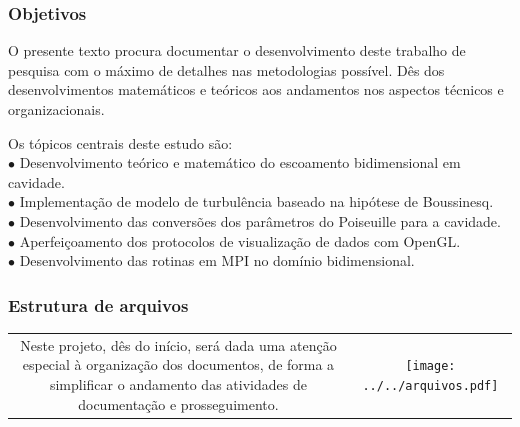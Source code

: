 \documentclass[xcolor=dvipsnames,10pt,aspectratio=169]{beamer}
\begin{document}
	\begin{frame}
		\frametitle{Objetivos}
					
		\centering
		O presente texto procura documentar o desenvolvimento deste trabalho de pesquisa com o máximo de detalhes nas metodologias possível. Dês dos desenvolvimentos matemáticos e teóricos aos andamentos nos aspectos técnicos e organizacionais.
		
		\vspace{0.5cm}
		
		\flushleft
		Os tópicos centrais deste estudo são:\\
		\quad $\bullet$ Desenvolvimento teórico e matemático do escoamento bidimensional em cavidade.\\
		\quad $\bullet$ Implementação de modelo de turbulência baseado na hipótese de Boussinesq. \\
		\quad $\bullet$ Desenvolvimento das conversões dos parâmetros do Poiseuille para a cavidade.\\
		\quad $\bullet$ Aperfeiçoamento dos protocolos de visualização de dados com OpenGL.\\
		\quad $\bullet$ Desenvolvimento das rotinas em MPI no domínio bidimensional.\\
		
	\end{frame}





	\begin{frame}
		\frametitle{Estrutura de arquivos}
		\begin{tabular}{c c}
			{
				\begin{minipage}[h!]{0.15\textwidth}
					\centering
					\small
					Neste projeto, dês do início, será dada uma atenção especial à organização dos documentos, de forma a simplificar o andamento das atividades de documentação e prosseguimento.
					\vspace{6cm}
				\end{minipage}
			}&{
				\texttt{[image: ../../arquivos.pdf]}
			}
		\end{tabular}

	\end{frame}
\end{document}
